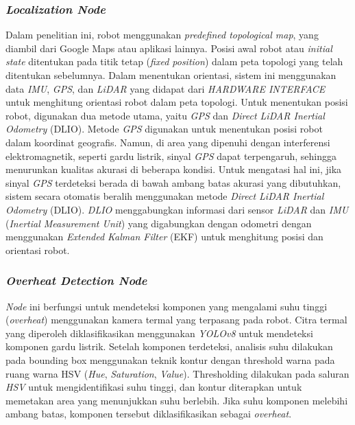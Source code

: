 \subsubsection{\emph{Localization Node}}
Dalam penelitian ini, robot menggunakan \emph{predefined topological map}, yang diambil dari Google Maps atau aplikasi lainnya. Posisi awal robot atau \emph{initial state} ditentukan pada titik tetap (\emph{fixed position}) dalam peta topologi yang telah ditentukan sebelumnya. Dalam menentukan orientasi, sistem ini menggunakan data \emph{IMU}, \emph{GPS}, dan \emph{LiDAR} yang didapat dari \emph{HARDWARE INTERFACE} untuk menghitung orientasi robot dalam peta topologi. Untuk menentukan posisi robot, digunakan dua metode utama, yaitu \emph{GPS} dan \emph{Direct LiDAR Inertial Odometry} (DLIO). Metode \emph{GPS} digunakan untuk menentukan posisi robot dalam koordinat geografis. Namun, di area yang dipenuhi dengan interferensi elektromagnetik, seperti gardu listrik, sinyal \emph{GPS} dapat terpengaruh, sehingga menurunkan kualitas akurasi di beberapa kondisi. Untuk mengatasi hal ini, jika sinyal \emph{GPS} terdeteksi berada di bawah ambang batas akurasi yang dibutuhkan, sistem secara otomatis beralih menggunakan metode \emph{Direct LiDAR Inertial Odometry} (DLIO). \emph{DLIO} menggabungkan informasi dari sensor \emph{LiDAR} dan \emph{IMU} (\emph{Inertial Measurement Unit}) yang digabungkan dengan odometri dengan menggunakan \emph{Extended Kalman Filter} (EKF) untuk menghitung posisi dan orientasi robot.

\subsubsection{\emph{Overheat Detection Node}}
\emph{Node} ini berfungsi untuk mendeteksi komponen yang mengalami suhu tinggi (\emph{overheat}) menggunakan kamera termal yang terpasang pada robot. Citra termal yang diperoleh diklasifikasikan menggunakan \emph{YOLOv8} untuk mendeteksi komponen gardu listrik. Setelah komponen terdeteksi, analisis suhu dilakukan pada bounding box menggunakan teknik kontur dengan threshold warna pada ruang warna HSV (\emph{Hue}, \emph{Saturation}, \emph{Value}). Thresholding dilakukan pada saluran \emph{HSV} untuk mengidentifikasi suhu tinggi, dan kontur diterapkan untuk memetakan area yang menunjukkan suhu berlebih. Jika suhu komponen melebihi ambang batas, komponen tersebut diklasifikasikan sebagai \emph{overheat}.

